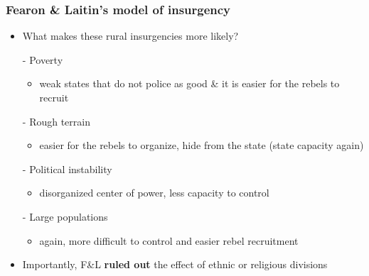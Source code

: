 \documentclass[utf8, xcolor=dvipsnames]{beamer}
\begin{document}
\begin{frame}
\frametitle{Fearon \& Laitin's model of insurgency}
\centering

\begin{itemize}[<+->]
  \item What makes these rural insurgencies more likely?
  \item[-] Poverty
  \begin{itemize}
    \item weak states that do not police as good \& it is easier for the rebels to recruit
  \end{itemize}
  \item[-] Rough terrain
  \begin{itemize}
    \item easier for the rebels to organize, hide from the state (state capacity again)
  \end{itemize}
  \item[-] Political instability
  \begin{itemize}
    \item disorganized center of power, less capacity to control
  \end{itemize}
  \item[-] Large populations
  \begin{itemize}
    \item again, more difficult to control and easier rebel recruitment
  \end{itemize}
  \item Importantly, F\&L \textbf{ruled out} the effect of ethnic or religious divisions
\end{itemize}

\end{frame}
\end{document}
